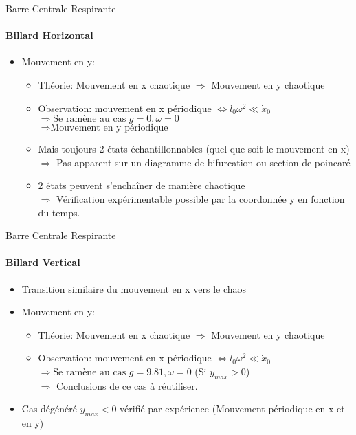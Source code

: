 \documentclass{beamer}
\begin{document}
  \begin{frame}{Barre Centrale Respirante}
  \framesubtitle{Billard Horizontal}
  \begin{itemize}
    \item Mouvement en y:
    \begin{itemize}
      \item Théorie: Mouvement en x chaotique \( \Rightarrow \) Mouvement en y chaotique
      \item Observation: mouvement en x périodique \( \Leftrightarrow l_0 \omega ^ 2 \ll \dot{x}_0 \)\\ \( \Rightarrow \text{Se ramène au cas } g=0, \omega =0\) \\ \( \Rightarrow \text{Mouvement en y périodique} \)
      \pause \item Mais toujours 2 états échantillonnables (quel que soit le mouvement en x)\\\(\Rightarrow\) Pas apparent sur un diagramme de bifurcation ou section de poincaré
      \item 2 états peuvent s'enchaîner de manière chaotique\\\(\Rightarrow\) Vérification expérimentable possible par la coordonnée y en fonction du temps.
    \end{itemize}
  \end{itemize}
  \end{frame}
  
    \begin{frame}{Barre Centrale Respirante}
  \framesubtitle{Billard Vertical}
  \begin{itemize}
    \item Transition similaire du mouvement en x vers le chaos
    \pause \item Mouvement en y:
    \begin{itemize}
      \item Théorie: Mouvement en x chaotique \( \Rightarrow \) Mouvement en y chaotique
      \item Observation: mouvement en x périodique \( \Leftrightarrow l_0 \omega ^ 2 \ll \dot{x}_0 \)\\ \( \Rightarrow \text{Se ramène au cas } g=9.81, \omega =0\) (Si \(y_{max}>0\))\\
      \( \Rightarrow\) Conclusions de ce cas à réutiliser.
    \end{itemize}
    \pause \item Cas dégénéré \(y_{max}<0\) vérifié par expérience (Mouvement périodique en x et en y)
  \end{itemize}
  \end{frame}
  
\end{document}
